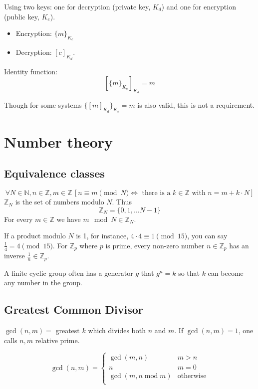 \documentclass{article}
\newcommand{\wmod}[1]{\pmod{#1}}
\newcommand{\ZZ}{\mathbb{Z}}
\newcommand{\Z}{\ZZ}
\newcommand{\NN}{\mathbb{N}}
\newcommand{\N}{\NN}
\begin{document}
Using two keys: one for decryption (private key, $K_d$) and one for encryption
(public key, $K_e$).

\begin{itemize}
  \item Encryption: $\{m\}_{K_e} $
  \item Decryption: $[c]_{K_d}$.
\end{itemize}

Identity function: 
\[
  [\{m\}_{K_e}]_{K_d} = m
\]

Though for some systems $\{[m]_{K_d}\}_{K_e} =m$ is also valid, this is not
a requirement.

\section{Number theory}

\subsection{Equivalence classes}

\[ \forall N \in \N, n \in \Z, m \in \Z 
  \,[n \equiv m \wmod{N} \Leftrightarrow 
      \text{ there is a } k \in \Z \text { with } n = m + k \cdot N]
\]
$\Z_N$ is the set of numbers modulo $N$. Thus 
\[ \Z_N = \{ 0, 1, \dots N-1\} \]
For every $m \in \Z$ we have $m \mod N \in \Z_N$.

If a product modulo $N$ is 1, for instance, $4 \cdot 4 \equiv 1 \wmod{15}$, you
can say $\frac{1}{4}=4 \wmod{15}$. For $\Z_p$ where $p$ is prime, every
non-zero number $n \in \Z_p$ has an inverse $\frac{1}{n} \in \Z_p$.

A finite cyclic group often has a generator $g$ that $g^n = k$ so that $k$ can become
any number in the group.

\subsection{Greatest Common Divisor}

$\gcd(n,m) = $ greatest $k$ which divides both $n$ and $m$. If $\gcd(n,m) = 1$, one
calls $n,m$ relative prime.

\[ 
  \gcd (n,m) = \begin{cases}
    \gcd(m,n) & m > n \\
    n & m=0 \\
    \gcd(m, n \operatorname{mod} m) & \text{otherwise}\\
  \end{cases}
\]
\end{document}
